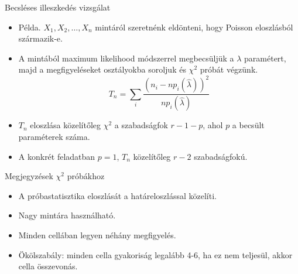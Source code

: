 \documentclass[aspectratio=169,notheorems,9pt,\option]{beamer}
\begin{document}
\begin{frame}{Becsléses illeszkedés vizsgálat}
  \begin{itemize}
    \item Példa. $X_1,X_2,\dots,X_n$ mintáról szeretnénk eldönteni, hogy
    Poisson eloszlásból származik-e.
    
    
    \item  A mintából maximum likelihood módszerrel megbecsüljük a
    $\lambda$ paramétert, majd a megfigyeléseket osztályokba soroljuk
    és $\chi^2$ próbát végzünk.
    \begin{displaymath}
      T_n=\sum_{i}\frac{(n_i-np_i(\hat\lambda))^2}{np_i (\hat\lambda)}
    \end{displaymath}
    
    \item $T_n$ eloszlása közelítőleg $\chi^2$ a szabadságfok $r-1-p$, ahol
    $p$ a becsült paraméterek száma.
    
    \item A konkrét feladatban $p=1$, $T_n$ közelítőleg $r-2$ szabadságfokú.
  \end{itemize}
\end{frame}

\begin{frame}{Megjegyzések $\chi^2$ próbákhoz}
  \begin{itemize}
    \item A próbastatisztika eloszlását a határeloszlással közelíti. 
    \item Nagy mintára használható.
    \item Minden cellában legyen néhány megfigyelés.
    \item Ökölszabály: minden  cella gyakoriság  %
    legalább 4-6, ha ez nem teljesül, akkor cella összevonás.
  \end{itemize}
  
\end{frame}
\end{document}
